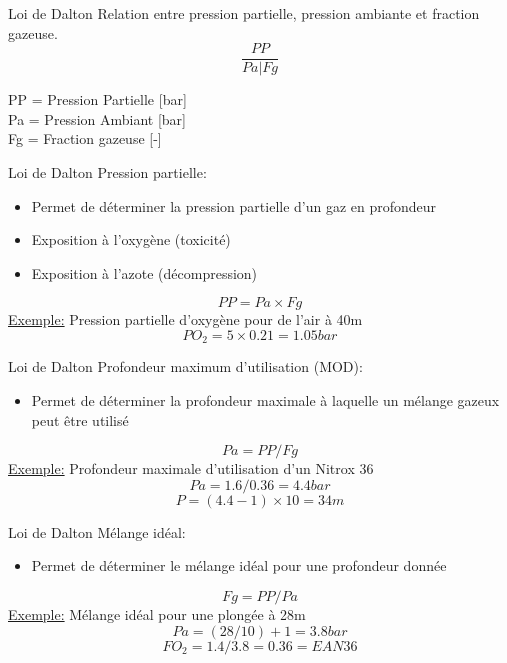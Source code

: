 \begin{frame}{Loi de Dalton}  
	Relation entre pression partielle, pression ambiante et fraction gazeuse.\\
	\[ \boxed{ \dfrac{PP}{Pa \bigg| Fg} } \]
	
	PP = Pression Partielle [bar]\\
	Pa = Pression Ambiant [bar]\\
	Fg = Fraction gazeuse [-]	
\end{frame}

\begin{frame}{Loi de Dalton}
	Pression partielle:
	\begin{itemize}
		\item Permet de déterminer la pression partielle d'un gaz en profondeur
		\item Exposition à l'oxygène (toxicité)
		\item Exposition à l'azote (décompression)
	\end{itemize}
	\[ \boxed {PP = Pa \times Fg} \]
	\vfill
	\underline{Exemple:}	Pression partielle d'oxygène pour de l'air à 40m\\
	\[ PO_2 = 5 \times 0.21 = 1.05 bar\]
\end{frame}

\begin{frame}{Loi de Dalton}
	Profondeur maximum d'utilisation (MOD):
	\begin{itemize}
		\item Permet de déterminer la profondeur maximale à laquelle un mélange gazeux peut être utilisé
	\end{itemize}
	\[ \boxed{Pa = PP / Fg} \]
	\vfill
	\underline{Exemple:}	Profondeur maximale d'utilisation d'un Nitrox 36\\
	\[ Pa = 1.6 / 0.36 = 4.4 bar \]
	\[ P = (4.4 - 1) \times 10 = 34m \]	
\end{frame}

\begin{frame}{Loi de Dalton}
	Mélange idéal:
	\begin{itemize}
		\item Permet de déterminer le mélange idéal pour une profondeur donnée
	\end{itemize}
	 \[ \boxed{Fg = PP / Pa} \]
	\vfill
	\underline{Exemple:}	Mélange idéal pour une plongée à 28m\\
	\[	Pa = (28 / 10)+1 = 3.8 bar\]
	\[ FO_2 = 1.4 / 3.8 = 0.36 = EAN36 \]
\end{frame}